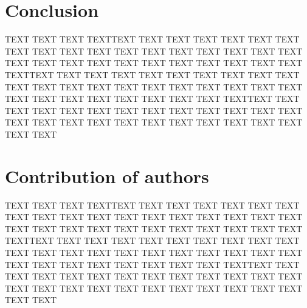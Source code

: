 \documentclass[10pt,conference,letterpaper]{IEEEtran}
\begin{document}
\section{Conclusion}

\par 
TEXT TEXT TEXT TEXTTEXT TEXT TEXT TEXT  TEXT TEXT  TEXT TEXT  TEXT TEXT  TEXT TEXT  TEXT TEXT  TEXT TEXT  TEXT TEXT  TEXT TEXT  TEXT TEXT  TEXT TEXT  TEXT TEXT 
TEXT TEXT TEXT TEXTTEXT TEXT TEXT TEXT  TEXT TEXT  TEXT TEXT  TEXT TEXT  TEXT TEXT  TEXT TEXT  TEXT TEXT  TEXT TEXT  TEXT TEXT  TEXT TEXT  TEXT TEXT  TEXT TEXT 
TEXT TEXT TEXT TEXTTEXT TEXT TEXT TEXT  TEXT TEXT  TEXT TEXT  TEXT TEXT  TEXT TEXT  TEXT TEXT  TEXT TEXT  TEXT TEXT  TEXT TEXT  TEXT TEXT  TEXT TEXT  TEXT TEXT 



\section{Contribution of authors}
\par 
TEXT TEXT TEXT TEXTTEXT TEXT TEXT TEXT  TEXT TEXT  TEXT TEXT  TEXT TEXT  TEXT TEXT  TEXT TEXT  TEXT TEXT  TEXT TEXT  TEXT TEXT  TEXT TEXT  TEXT TEXT  TEXT TEXT 
TEXT TEXT TEXT TEXTTEXT TEXT TEXT TEXT  TEXT TEXT  TEXT TEXT  TEXT TEXT  TEXT TEXT  TEXT TEXT  TEXT TEXT  TEXT TEXT  TEXT TEXT  TEXT TEXT  TEXT TEXT  TEXT TEXT 
TEXT TEXT TEXT TEXTTEXT TEXT TEXT TEXT  TEXT TEXT  TEXT TEXT  TEXT TEXT  TEXT TEXT  TEXT TEXT  TEXT TEXT  TEXT TEXT  TEXT TEXT  TEXT TEXT  TEXT TEXT  TEXT TEXT 



%
\end{document}
